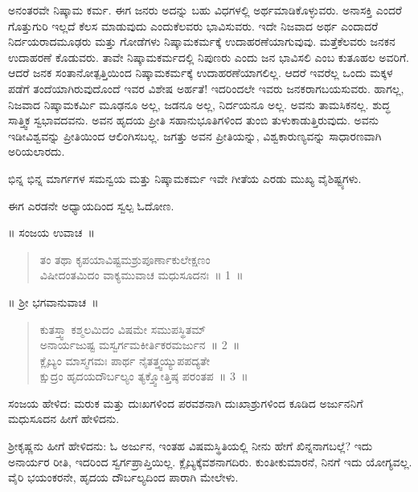 ಅನಂತರವೇ ನಿಷ್ಕಾಮ ಕರ್ಮ. ಈಗ ಜನರು ಅದನ್ನು ಬಹು ವಿಧಗಳಲ್ಲಿ ಅರ್ಥಮಾಡಿ\-ಕೊಳ್ಳುವರು. ಅನಾಸಕ್ತಿ ಎಂದರೆ ಗೊತ್ತುಗುರಿ ಇಲ್ಲದೆ ಕೆಲಸ ಮಾಡುವುದು ಎಂದು\break ಕೆಲವರು ಭಾವಿಸುವರು. ಇದೇ ನಿಜವಾದ ಅರ್ಥ ಎಂದಾದರೆ ನಿರ್ದಯರಾದ\break ಮೂಢರು ಮತ್ತು ಗೋಡೆಗಳು ನಿಷ್ಕಾಮಕರ್ಮಕ್ಕೆ ಉದಾಹರಣೆಯಾಗುವುವು. ಮತ್ತೆ\break ಕೆಲವರು ಜನಕನ ಉದಾಹರಣೆ ಕೊಡುವರು. ತಾವೇ ನಿಷ್ಕಾಮಕರ್ಮದಲ್ಲಿ ನಿಪುಣರು ಎಂದು ಜನ ಭಾವಿಸಲಿ ಎಂಬ ಕುತೂಹಲ ಅವರಿಗೆ. ಆದರೆ ಜನಕ ಸಂತಾನೋತ್ಪತ್ತಿಯಿಂದ ನಿಷ್ಕಾಮಕರ್ಮಕ್ಕೆ ಉದಾಹರಣೆಯಾಗಲಿಲ್ಲ. ಆದರೆ ಇವರೆಲ್ಲ ಒಂದು ಮಕ್ಕಳ ಪಡೆಗೆ ತಂದೆಯಾಗಿರುವುದೊಂದೆ ಇವರ ವಿಶೇಷ ಅರ್ಹತೆ! ಇದರಿಂದಲೇ ಇವರು ಜನಕರಾಗಬಯಸುವರು. ಹಾಗಲ್ಲ, ನಿಜವಾದ ನಿಷ್ಕಾಮಕರ್ಮಿ ಮೂಢನೂ ಅಲ್ಲ, ಜಡನೂ ಅಲ್ಲ, ನಿರ್ದಯನೂ ಅಲ್ಲ. ಅವನು ತಾಮಸಿಕನಲ್ಲ. ಶುದ್ಧ ಸಾತ್ತ್ವಿಕ ಸ್ವಭಾವದವನು. ಅವನ ಹೃದಯ ಪ್ರೀತಿ ಸಹಾನುಭೂತಿಗಳಿಂದ ತುಂಬಿ ತುಳುಕಾಡುತ್ತಿರುವುದು. ಅವನು ಇಡೀ\break ವಿಶ್ವವನ್ನು ಪ್ರೀತಿಯಿಂದ ಆಲಿಂಗಿಸಬಲ್ಲ. ಜಗತ್ತು ಅವನ ಪ್ರೀತಿಯನ್ನು, ವಿಶ್ವಕಾರುಣ್ಯವನ್ನು ಸಾಧಾರಣವಾಗಿ ಅರಿಯಲಾರದು.

ಭಿನ್ನ ಭಿನ್ನ ಮಾರ್ಗಗಳ ಸಮನ್ವಯ ಮತ್ತು ನಿಷ್ಕಾಮಕರ್ಮ ಇವೇ ಗೀತೆಯ ಎರಡು ಮುಖ್ಯ ವೈಶಿಷ್ಟ್ಯಗಳು.

\vskip 0.2cm

ಈಗ ಎರಡನೇ ಅಧ್ಯಾಯದಿಂದ ಸ್ವಲ್ಪ ಓದೋಣ.

\vskip 0.2cm

॥ ಸಂಜಯ ಉವಾಚ~॥

\begin{verse}
 ತಂ ತಥಾ ಕೃಪಯಾವಿಷ್ಟಮಶ್ರುಪೂರ್ಣಾಕುಲೇಕ್ಷಣಂ\\
 ವಿಷೀದಂತಮಿದಂ ವಾಕ್ಯಮುವಾಚ ಮಧುಸೂದನಃ~॥ 1~॥
\end{verse}

\newpage

॥ ಶ‍್ರೀ ಭಗವಾನುವಾಚ~॥

\begin{verse}
 ಕುತಸ್ತ್ವಾ ಕಶ್ಮಲಮಿದಂ ವಿಷಮೇ ಸಮುಪಸ್ಥಿತಮ್​\\
 ಅನಾರ್ಯಜುಷ್ಟ ಮಸ್ವರ್ಗಮಕೀರ್ತಿಕರಮರ್ಜುನ~॥ 2~॥\\
 ಕ್ಲೈಬ್ಯಂ ಮಾಸ್ಮಗಮಃ ಪಾರ್ಥ ನೈತತ್ತ್ವಯ್ಯುಪಪದ್ಯತೇ\\
 ಕ್ಷುದ್ರಂ ಹೃದಯದೌರ್ಬಲ್ಯಂ ತ್ಯಕ್ತ್ವೋತ್ತಿಷ್ಠ ಪರಂತಪ~॥ 3~॥
\end{verse}

ಸಂಜಯ ಹೇಳಿದ: ಮರುಕ ಮತ್ತು ದುಃಖಗಳಿಂದ ಪರವಶನಾಗಿ ದುಃಖಾಶ್ರುಗಳಿಂದ ಕೂಡಿದ ಅರ್ಜುನನಿಗೆ ಮಧುಸೂದನ ಹೀಗೆ ಹೇಳಿದನು.

ಶ‍್ರೀಕೃಷ್ಣನು ಹೀಗೆ ಹೇಳಿದನು: ಓ ಅರ್ಜುನ, ಇಂತಹ ವಿಷಮಸ್ಥಿತಿಯಲ್ಲಿ ನೀನು ಹೇಗೆ ಖಿನ್ನನಾಗಬಲ್ಲೆ? ಇದು ಅನಾರ್ಯರ ರೀತಿ, ಇದರಿಂದ ಸ್ವರ್ಗಪ್ರಾಪ್ತಿಯಿಲ್ಲ. ಕ್ಲೈಬ್ಯಕ್ಕೆ\break ವಶನಾಗದಿರು. ಕುಂತೀಕುಮಾರನೆ, ನಿನಗೆ ಇದು ಯೋಗ್ಯವಲ್ಲ. ವೈರಿ ಭಯಂಕರನೇ, ಹೃದಯ ದೌರ್ಬಲ್ಯದಿಂದ ಪಾರಾಗಿ ಮೇಲೇಳು.

